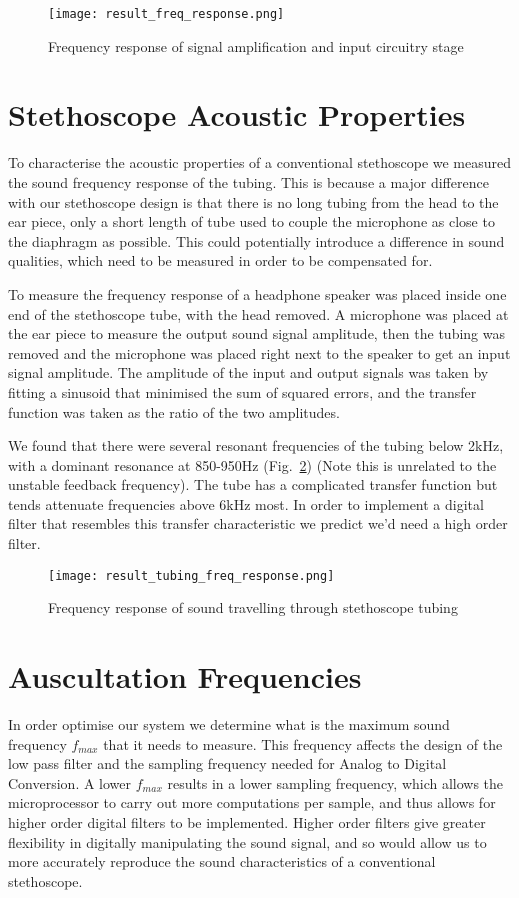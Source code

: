 \begin{figure}[!htb]
	\centering
		\texttt{[image: result\_freq\_response.png]}
	\caption{Frequency response of signal amplification and input circuitry stage}
	\label{fig:result_circuit_freq_response}
\end{figure}


\section{Stethoscope Acoustic Properties}
To characterise the acoustic properties of a conventional stethoscope we measured the sound frequency response of the tubing. This is because a major difference with our stethoscope design is that there is no long tubing from the head to the ear piece, only a short length of tube used to couple the microphone as close to the diaphragm as possible. This could potentially introduce a difference in sound qualities, which need to be measured in order to be compensated for.

To measure the frequency response of a headphone speaker was placed inside one end of the stethoscope tube, with the head removed. A microphone was placed at the ear piece to measure the output sound signal amplitude, then the tubing was removed and the microphone was placed right next to the speaker to get an input signal amplitude. The amplitude of the input and output signals was taken by fitting a sinusoid that minimised the sum of squared errors, and the transfer function was taken as the ratio of the two amplitudes. 

We found that there were several resonant frequencies of the tubing below 2kHz, with a dominant resonance at 850-950Hz (Fig.~\ref{fig:result_tubing_freq_response}) (Note this is unrelated to the unstable feedback frequency). The tube has a complicated transfer function but tends attenuate frequencies above 6kHz most. In order to implement a digital filter that resembles this transfer characteristic we predict we'd need a high order filter.

\begin{figure}[!htb]
	\centering
		\texttt{[image: result\_tubing\_freq\_response.png]}
	\caption{Frequency response of sound travelling through stethoscope tubing}
	\label{fig:result_tubing_freq_response}
\end{figure}

\section{Auscultation Frequencies} \label{max-sound-freq}
In order optimise our system we determine what is the maximum sound frequency $f_{max}$ that it needs to measure. This frequency affects the design of the low pass filter and the sampling frequency needed for Analog to Digital Conversion. A lower $f_{max}$ results in a lower sampling frequency, which allows the microprocessor to carry out more computations per sample, and thus allows for higher order digital filters to be implemented. Higher order filters give greater flexibility in digitally manipulating the sound signal, and so would allow us to more accurately reproduce the sound characteristics of a conventional stethoscope.

